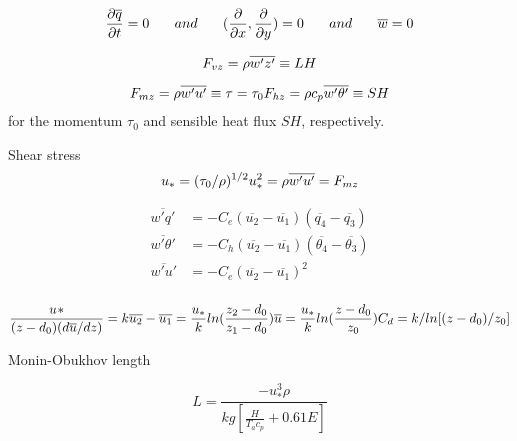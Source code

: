 \documentclass[12pt]{article}
\begin{document}
\begin{equation}
\frac{\partial{\overline{q}}}{\partial{t}}=0\phantom{XX}and\phantom{XX}(\frac{\partial{}}{\partial{x}},\frac{\partial{}}{\partial{y}})=0 \phantom{XX}and\phantom{XX} \overline{w}=0\\
\end{equation}

\begin{equation}
F_{vz}=\rho\overline{w'z'}\equiv LH\\
\end{equation}

\begin{equation}
F_{mz}=\rho\overline{w'u'}\equiv\tau=\tau_{0}\\
%
F_{hz}=\rho c_{p}\overline{w'\theta'}\equiv SH\\
\end{equation}
for the momentum $\tau_{0}$ and sensible heat flux $SH$, respectively. 

Shear stress
\begin{equation}
u_{*}=(\tau_{0}/\rho)^{1/2}\\
%
u_{*}^{2}=\rho\overline{w'u'}=F_{mz}\\
\end{equation}

\begin{equation}
\begin{split}
\overline{w'q'}&=-C_{e}(\overline{u_{2}}-\overline{u_{1}})(\overline{q_{4}}-\overline{q_{3}})\\
%
\overline{w'\theta'}&=-C_{h}(\overline{u_{2}}-\overline{u_{1}})(\overline{\theta_{4}}-\overline{\theta_{3}})\\
%
\overline{w'u'}&=-C_{e}(\overline{u_{2}}-\overline{u_{1}})^{2}\\
%
\end{split}
\end{equation}

\begin{equation}
\frac{u_{}*}{(z-d_{0})(d\overline{u}/dz)}=k\\
\overline{u_{2}}-\overline{u_{1}}=\frac{u_{*}}{k}{ln}(\frac{z_{2}-d_{0}}{z_{1}-d_{0}})\\
%
\overline{u}=\frac{u_{*}}{k}{ln}(\frac{z-d_{0}}{z_{0}})\\
%
C_{d}={k/ln[(z-d_{0})/z_{0}]}\\
\end{equation}

Monin-Obukhov length

$$L=\frac{-u^{3}_{*}\rho}{kg[ \frac{H}{T_{a}c_{p}} + 0.61E ]}$$
\end{document}
